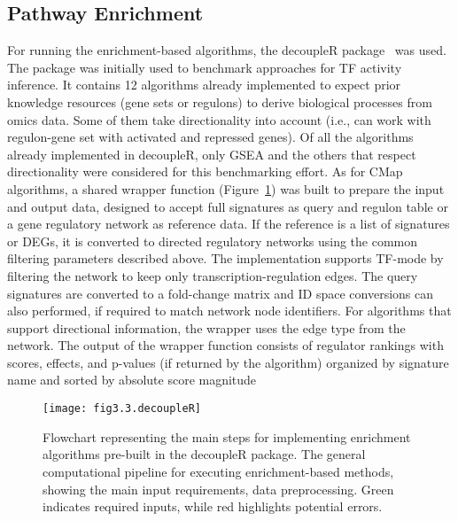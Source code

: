 \subsection{Pathway Enrichment} %
\label{sub:pathwayenrichment}

For running the enrichment-based algorithms, the decoupleR package~\cite{RN35} was used. 
The package was initially used to benchmark approaches for \gls{TF} activity inference. 
It contains 12 algorithms already implemented to expect prior knowledge resources (gene sets or regulons) to derive biological processes from omics data. 
Some of them take directionality into account (i.e., can work with regulon-gene set with activated and repressed genes). 
Of all the algorithms already implemented in decoupleR, only \gls{GSEA} and the others that respect directionality were considered for this benchmarking effort. As for \gls{CMap} algorithms, a shared wrapper function (Figure~\ref{fig:fig3.3.decoupleR}) was built to prepare the input and output data, designed to accept full signatures as query and regulon table or a gene regulatory network as reference data. If the reference is a list of signatures or \gls{DEGs}, it is converted to directed regulatory networks using the common filtering parameters described above. 
The implementation supports \gls{TF}-mode by filtering the network to keep only transcription-regulation edges. 
The query signatures are converted to a fold-change matrix and ID space conversions can also performed, if required to match network node identifiers. 
For algorithms that support directional information, the wrapper uses the edge type from the network.
The output of the wrapper function consists of regulator rankings with scores, effects, and p-values (if returned by the algorithm) organized by signature name and sorted by absolute score magnitude

\begin{figure}[htbp]
    \centering
    \texttt{[image: fig3.3.decoupleR]}
    \caption[Flowchart representing the main steps for implementing enrichment algorithms pre-built in the decoupleR package.]{Flowchart representing the main steps for implementing enrichment algorithms pre-built in the decoupleR package. The general computational pipeline for executing enrichment-based methods, showing the main input requirements, data preprocessing. Green indicates required inputs, while red highlights potential errors.}
    \label{fig:fig3.3.decoupleR}
\end{figure}


